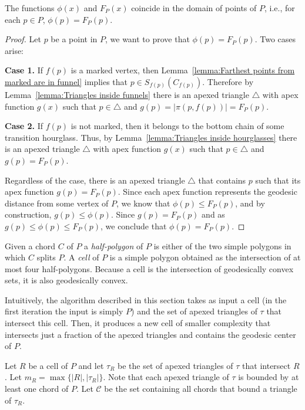 \documentclass[a4paper,UKenglish]{lipics}
\newcommand{\F}[2]{\ensuremath{F_{\scriptscriptstyle #1}(#2)}}
\newcommand{\fn}[2]{\ensuremath{S_{\scriptscriptstyle #1}(#2)}}
\newcommand{\ff}[1]{\ensuremath{f(#1)}}
\newcommand{\m}{\ensuremath{m_{\scriptscriptstyle R}}}
\newcommand{\g}[2]{\ensuremath{|\pi(#1, #2)|}}
\begin{document}
\begin{lemma}\label{lemma:Optimization problem same as geodesic center}
The functions $\phi(x)$ and $\F{P}{x}$ coincide in the domain of points of $P$, i.e., for each $p\in P$, $\phi(p) = \F{P}{p}$.
\end{lemma}
\begin{proof}
Let $p$ be a point in $P$, we want to prove that $\phi(p) = \F{P}{p}$. 
Two cases arise: 

\textbf{Case 1.} If $\ff{p}$ is a marked vertex, then Lemma~\ref{lemma:Farthest points from marked are in funnel} implies that $p\in \fn{\ff{p}}{C_{\ff{p}}}$. Therefore
by Lemma~\ref{lemma:Triangles inside funnels} there is an apexed triangle $\triangle$ with apex function $g(x)$ such that $p\in \triangle$ and $g(p) = \g{p}{\ff{p}} = \F{P}{p}$.

\textbf{Case 2.} If $\ff{p}$ is not marked, then it belongs to the bottom chain of some transition hourglass. Thus, by Lemma~\ref{lemma:Triangles inside hourglasses} there is an apexed triangle $\triangle$ with apex function $g(x)$ such that $p\in \triangle$ and $g(p) = \F{P}{p}$.

Regardless of the case, there is an apexed triangle $\triangle$ that contains $p$ such that its apex function $g(p) = \F{P}{p}$.
Since each apex function represents the geodesic distance from some vertex of $P$, we know that $\phi(p) \leq \F{P}{p}$, and by construction, $g(p) \leq \phi(p)$.
Since $g(p) = \F{P}{p}$ and as $g(p) \leq \phi(p) \leq  \F{P}{p}$, we conclude that $\phi(p) = \F{P}{p}$.
\end{proof}

Given a chord $C$ of $P$ a \emph{half-polygon} of $P$ is either of the two simple polygons in which $C$ splits $P$.
A \emph{cell} of $P$ is a simple polygon obtained as the intersection of at most four half-polygons.
Because a cell is the intersection of geodesically convex sets, it is also geodesically convex.

Intuitively, the algorithm described in this section takes as input a cell (in the first iteration the input is simply $P$) and the set of apexed triangles of $\tau$ that intersect this cell. Then, it produces a new cell of smaller complexity that intersects just a fraction of the apexed triangles and contains the geodesic center of $P$.

Let $R$ be a cell of $P$ and let $\tau_R$ be the set of apexed triangles of $\tau$ that intersect $R$. 
Let $\m = \max\{|R|, |\tau_R|\}$.
Note that each apexed triangle of $\tau$ is bounded by at least one chord of $P$.
Let $\mathcal C$ be the set containing all chords that bound a triangle of $\tau_R$. 
\end{document}
